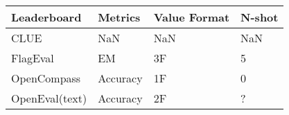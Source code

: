 \begin{tabular}{llll}
\toprule
Leaderboard & Metrics & Value Format & N-shot \\
\midrule
CLUE & NaN & NaN & NaN \\
FlagEval & EM & 3F & 5 \\
OpenCompass & Accuracy & 1F & 0 \\
OpenEval(text) & Accuracy & 2F & ? \\
\bottomrule
\end{tabular}

